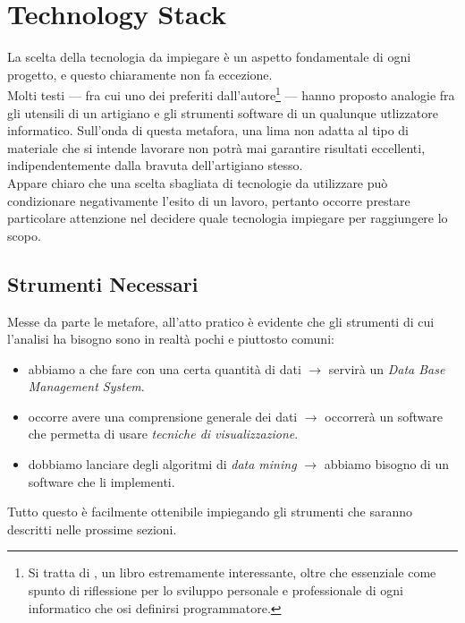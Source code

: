 \chapter{Technology Stack}
\label{ch:tech}

La scelta della tecnologia da impiegare è un aspetto fondamentale di ogni progetto, e questo chiaramente non fa eccezione. \\

Molti testi --- fra cui uno dei preferiti dall'autore\footnote{Si tratta di \cite{pragmatic}, un libro estremamente interessante, oltre che essenziale come spunto di riflessione per lo sviluppo personale e professionale di ogni informatico che osi definirsi programmatore.} --- hanno proposto analogie fra gli utensili di un artigiano e gli strumenti software di un qualunque utlizzatore informatico. Sull'onda di questa metafora, una lima non adatta al tipo di materiale che si intende lavorare non potrà mai garantire risultati eccellenti, indipendentemente dalla bravuta dell'artigiano stesso. \\

Appare chiaro che una scelta sbagliata di tecnologie da utilizzare può condizionare negativamente l'esito di un lavoro, pertanto occorre prestare particolare attenzione nel decidere quale tecnologia impiegare per raggiungere lo scopo.

\section{Strumenti Necessari}

    Messe da parte le metafore, all'atto pratico è evidente che gli strumenti di cui l'analisi ha bisogno sono in realtà pochi e piuttosto comuni:

    \begin{itemize}
        \item abbiamo a che fare con una certa quantità di dati $\rightarrow$ servirà un \textit{Data Base Management System}.
        \item occorre avere una comprensione generale dei dati $\rightarrow$ occorrerà un software che permetta di usare \textit{tecniche di visualizzazione}.
        \item dobbiamo lanciare degli algoritmi di \textit{data mining} $\rightarrow$ abbiamo bisogno di un software che li implementi.
    \end{itemize}

    Tutto questo è facilmente ottenibile impiegando gli strumenti che saranno descritti nelle prossime sezioni.

